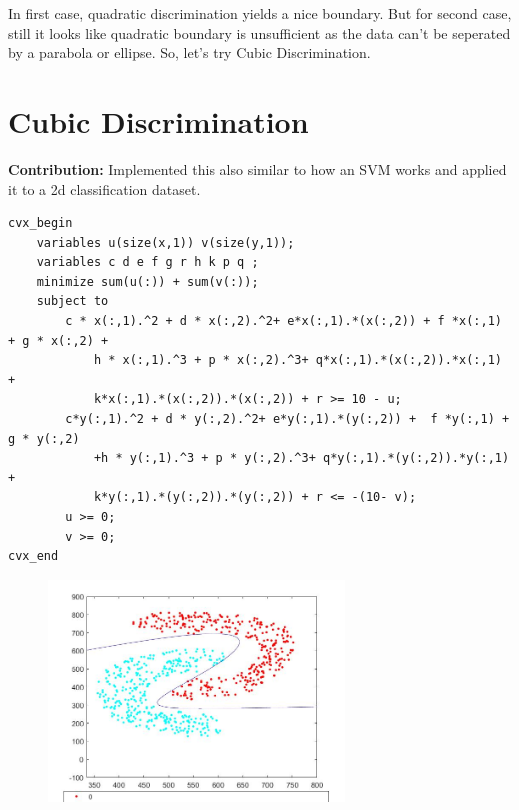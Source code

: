 \documentclass{article}
\begin{document}
In first case, quadratic discrimination yields a nice boundary. But for second case, still it looks like quadratic boundary is unsufficient as the data can't be seperated by a parabola or ellipse. So, let's try Cubic Discrimination.

\newpage
\section{Cubic Discrimination}
\textbf{Contribution:} Implemented this also similar to how an SVM works and applied it to a 2d classification dataset.
\begin{verbatim}
cvx_begin
    variables u(size(x,1)) v(size(y,1));
    variables c d e f g r h k p q ;
    minimize sum(u(:)) + sum(v(:));
    subject to
        c * x(:,1).^2 + d * x(:,2).^2+ e*x(:,1).*(x(:,2)) + f *x(:,1) + g * x(:,2) + 
            h * x(:,1).^3 + p * x(:,2).^3+ q*x(:,1).*(x(:,2)).*x(:,1) + 
            k*x(:,1).*(x(:,2)).*(x(:,2)) + r >= 10 - u;
        c*y(:,1).^2 + d * y(:,2).^2+ e*y(:,1).*(y(:,2)) +  f *y(:,1) + g * y(:,2)
            +h * y(:,1).^3 + p * y(:,2).^3+ q*y(:,1).*(y(:,2)).*y(:,1) + 
            k*y(:,1).*(y(:,2)).*(y(:,2)) + r <= -(10- v);
        u >= 0;
        v >= 0;
cvx_end
\end{verbatim}
\begin{figure}[h!]
    \includegraphics[width=0.7\textwidth, center ]{data5.jpg}
\end{figure}

\newpage
\end{document}
